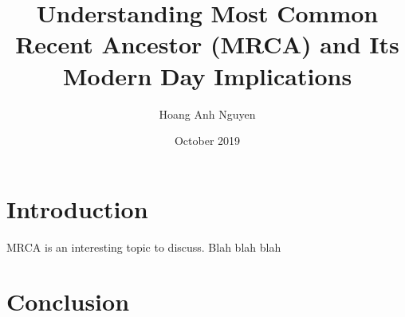 \documentclass{article}
\title{Understanding Most Common Recent Ancestor (MRCA) and Its Modern Day Implications}
\author{Hoang Anh Nguyen}
\date{October 2019}
\begin{document}
\maketitle

\section{Introduction}
MRCA is an interesting topic to discuss. Blah blah blah

\section{Conclusion}
\end{document}
